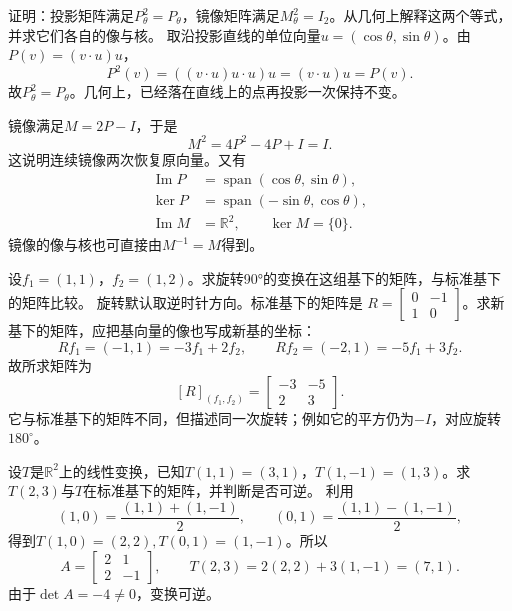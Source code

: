 证明：投影矩阵满足\(P_{\theta}^{2} = P_{\theta}\)，镜像矩阵满足\(M_{\theta}^{2} = I_{2}\)。从几何上解释这两个等式，并求它们各自的像与核。
\solutionanswer
取沿投影直线的单位向量\(u=(\cos\theta,\sin\theta)\)。由\(P(v)=(v\cdot u)u\)，
\[
P^2(v)=((v\cdot u)u\cdot u)u=(v\cdot u)u=P(v).
\]
故\(P_\theta^2=P_\theta\)。几何上，已经落在直线上的点再投影一次保持不变。

镜像满足\(M=2P-I\)，于是
\[
M^2=4P^2-4P+I=I.
\]
这说明连续镜像两次恢复原向量。又有
\[
\begin{aligned}
\operatorname{Im}P&=\operatorname{span}(\cos\theta,\sin\theta),\\
\ker P&=\operatorname{span}(-\sin\theta,\cos\theta),\\
\operatorname{Im}M&=\mathbb R^2,\qquad \ker M=\{0\}.
\end{aligned}
\]
镜像的像与核也可直接由\(M^{-1}=M\)得到。


设\(f_{1} = \left( 1 , 1 \right)\)，\(f_{2} = \left( 1 , 2 \right)\)。求旋转90°的变换在这组基下的矩阵，与标准基下的矩阵比较。
\solutionanswer
旋转默认取逆时针方向。标准基下的矩阵是
\(R=\begin{bmatrix}0&-1\\1&0\end{bmatrix}\)。求新基下的矩阵，应把基向量的像也写成新基的坐标：
\[
R f_1=(-1,1)=-3f_1+2f_2,\qquad
R f_2=(-2,1)=-5f_1+3f_2.
\]
故所求矩阵为
\[
[R]_{(f_1,f_2)}=\begin{bmatrix}-3&-5\\2&3\end{bmatrix}.
\]
它与标准基下的矩阵不同，但描述同一次旋转；例如它的平方仍为\(-I\)，对应旋转\(180^\circ\)。


设\(T\)是\(\mathbb{R}^{2}\)上的线性变换，已知\(T \left( 1 , 1 \right) = \left( 3 , 1 \right)\)，\(T \left( 1 , - 1 \right) = \left( 1 , 3 \right)\)。求\(T \left( 2 , 3 \right)\)与\(T\)在标准基下的矩阵，并判断是否可逆。
\solutionanswer
利用
\[
(1,0)=\frac{(1,1)+(1,-1)}2,\qquad
(0,1)=\frac{(1,1)-(1,-1)}2,
\]
得到\(T(1,0)=(2,2),T(0,1)=(1,-1)\)。所以
\[
A=\begin{bmatrix}2&1\\2&-1\end{bmatrix},\qquad
T(2,3)=2(2,2)+3(1,-1)=(7,1).
\]
由于\(\det A=-4\ne0\)，变换可逆。


